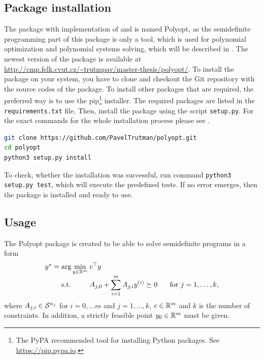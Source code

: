 \subsection{Package installation}
The package with implementation of  and  is named Polyopt, as the semidefinite programming part of this package is only a tool, which is  used for polynomial optimization and polynomial systems solving, which will be described in .
The newest version of the package is available at \url{http://cmp.felk.cvut.cz/~trutmpav/master-thesis/polyopt/}.
To install the package on your system, you have to clone and checkout the Git repository with the source codes of the package.
To install other packages that are required, the preferred way is to use the pip\footnote{The PyPA recommended tool for installing Python packages. See \url{https://pip.pypa.io}.} installer. The required packages are listed in the \texttt{requirements.txt} file.
Then, install the package using the script \texttt{setup.py}.
For the exact commands for the whole installation process please see .
\begin{lstlisting}[language=bash, caption={Installation of the package Polyopt.}, labellis={SDP:imp:install}]
git clone https://github.com/PavelTrutman/polyopt.git
cd polyopt
python3 setup.py install
\end{lstlisting}
To check, whether the installation was successful, run command \texttt{python3 setup.py test}, which will execute the predefined tests.
If no error emerges, then the package is installed and ready to use.

\subsection{Usage}
The Polyopt package is created to be able to solve semidefinite programs in a form
\begin{align}
  \arraycolsep=1.4pt
  \begin{array}{rclrcl@{\hskip0.5cm}l}
    y^* &=& \displaystyle \arg\min_{y\in\R^m} & \multicolumn{3}{l}{c^\top y} \\
    && \text{s.t.} & \displaystyle A_{j,0} + \sum_{i=1}^m A_{j,i}y\ind i &\succeq& 0 & \text{ for } j = 1,\ldots,k,
  \end{array}\labeleq{SDP:imp:problem}
\end{align}
where $A_{j,i}\in\mathcal{S}^{n_j}$ for $i = 0,\dots m$ and $j=1,\dots,k$, $c\in\mathbb{R}^m$ and $k$ is the number of constraints.
In addition, a strictly feasible point $y_0\in\mathbb{R}^m$ must be given.

